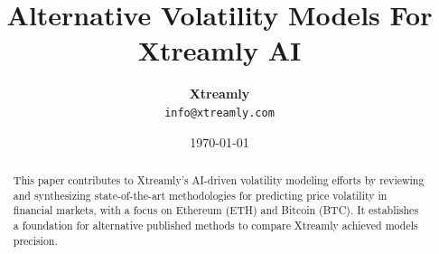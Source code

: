 \documentclass[9pt]{article}
\begin{document}
	
	\title{\textbf{Alternative Volatility Models For Xtreamly AI}}
	\author{
		\small
		\textbf{Xtreamly} \\
		\texttt{info@xtreamly.com}
	}
	\date{\today}
	\maketitle
	
	\begin{abstract}
		\justifying
		This paper contributes to Xtreamly’s AI-driven volatility modeling efforts by reviewing and synthesizing state-of-the-art methodologies for predicting price volatility in financial markets, with a focus on Ethereum (ETH) and Bitcoin (BTC). It establishes a foundation for alternative published methods to compare Xtreamly achieved models precision.
	\end{abstract}
	
	\vspace{0.5cm}
	
\end{document}
